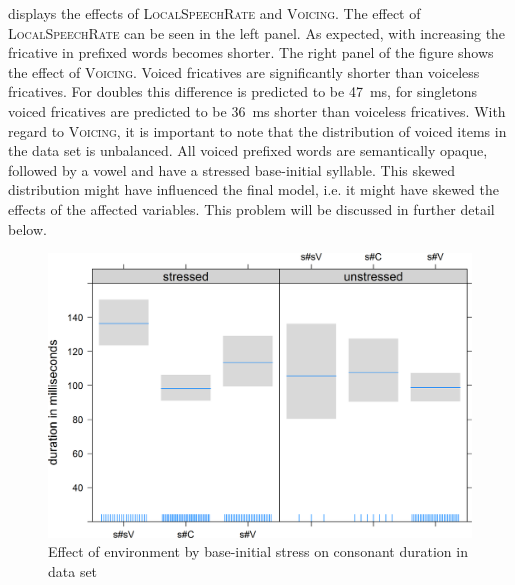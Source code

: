  displays the effects of \textsc{LocalSpeechRate} and \textsc{Voicing}. The effect of \textsc{LocalSpeechRate} can be seen in the left panel. As expected, with increasing  the fricative in prefixed words becomes shorter. 
The right panel of the figure shows the effect of \textsc{Voicing}. Voiced fricatives are significantly shorter than voiceless fricatives. For doubles this difference is predicted to be 47~ms, for singletons voiced fricatives are predicted to be 36~ms shorter than voiceless fricatives. 
With regard to \textsc{Voicing}, it is important to note that the distribution of voiced items in the data set is unbalanced. All voiced prefixed words are semantically opaque, followed by a vowel and have a stressed base-initial syllable. This skewed distribution might have influenced the final model, i.e. it might have skewed the effects of the affected variables. This problem will be discussed in further detail below.

\begin{figure}
	\includegraphics [scale=0.5]{images/Corpus/disModelTransitionTypeByStress.png}
	\caption{Effect of environment by base-initial stress on consonant duration in data set}
	\label{fig:corpus main effect 1 dis}
\end{figure}

